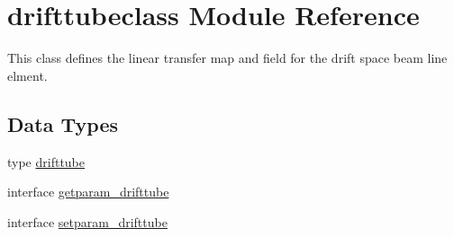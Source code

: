 \hypertarget{namespacedrifttubeclass}{}\section{drifttubeclass Module Reference}
\label{namespacedrifttubeclass}


This class defines the linear transfer map and field for the drift space beam line elment.  


\subsection*{Data Types}
\begin{DoxyCompactItemize}
\item 
type \mbox{\hyperlink{namespacedrifttubeclass_structdrifttubeclass_1_1drifttube}{drifttube}}
\item 
interface \mbox{\hyperlink{interfacedrifttubeclass_1_1getparam__drifttube}{getparam\+\_\+drifttube}}
\item 
interface \mbox{\hyperlink{interfacedrifttubeclass_1_1setparam__drifttube}{setparam\+\_\+drifttube}}
\end{DoxyCompactItemize}
